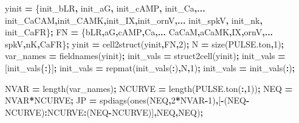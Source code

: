 \documentclass[
]{article}
\newenvironment{Shaded}{\begin{snugshade}}{\end{snugshade}}
\newcommand{\FloatTok}[1]{\textcolor[rgb]{0.00,0.00,0.81}{#1}}
\newcommand{\FunctionTok}[1]{\textcolor[rgb]{0.00,0.00,0.00}{#1}}
\newcommand{\NormalTok}[1]{#1}
\newcommand{\OperatorTok}[1]{\textcolor[rgb]{0.81,0.36,0.00}{\textbf{#1}}}
\newcommand{\StringTok}[1]{\textcolor[rgb]{0.31,0.60,0.02}{#1}}
\begin{document}
\begin{Shaded}
\begin{Highlighting}[]
\NormalTok{yinit }\OperatorTok{=}\NormalTok{ \{init\_bLR}\OperatorTok{,}\NormalTok{ init\_aG}\OperatorTok{,}\NormalTok{ init\_cAMP}\OperatorTok{,}\NormalTok{ init\_Ca}\OperatorTok{,...}
\NormalTok{        init\_CaCAM}\OperatorTok{,}\NormalTok{init\_CAMK}\OperatorTok{,}\NormalTok{init\_IX}\OperatorTok{,}\NormalTok{init\_ornV}\OperatorTok{,...}
\NormalTok{        init\_spkV}\OperatorTok{,}\NormalTok{ init\_nk}\OperatorTok{,}\NormalTok{ init\_CaFR\}}\OperatorTok{;}
\NormalTok{FN }\OperatorTok{=}\NormalTok{ \{}\StringTok{\textquotesingle{}bLR\textquotesingle{}}\OperatorTok{,}\StringTok{\textquotesingle{}aG\textquotesingle{}}\OperatorTok{,}\StringTok{\textquotesingle{}cAMP\textquotesingle{}}\OperatorTok{,}\StringTok{\textquotesingle{}Ca\textquotesingle{}}\OperatorTok{,...}
    \StringTok{\textquotesingle{}CaCaM\textquotesingle{}}\OperatorTok{,}\StringTok{\textquotesingle{}aCaMK\textquotesingle{}}\OperatorTok{,}\StringTok{\textquotesingle{}IX\textquotesingle{}}\OperatorTok{,}\StringTok{\textquotesingle{}ornV\textquotesingle{}}\OperatorTok{,...}
    \StringTok{\textquotesingle{}spkV\textquotesingle{}}\OperatorTok{,}\StringTok{\textquotesingle{}nK\textquotesingle{}}\OperatorTok{,}\StringTok{\textquotesingle{}CaFR\textquotesingle{}}\NormalTok{\}}\OperatorTok{;}
\NormalTok{yinit }\OperatorTok{=} \FunctionTok{cell2struct}\NormalTok{(yinit}\OperatorTok{,}\NormalTok{FN}\OperatorTok{,}\FloatTok{2}\NormalTok{)}\OperatorTok{;}
\NormalTok{N }\OperatorTok{=} \FunctionTok{size}\NormalTok{(PULSE.ton}\OperatorTok{,}\FloatTok{1}\NormalTok{)}\OperatorTok{;}
\NormalTok{var\_names }\OperatorTok{=} \FunctionTok{fieldnames}\NormalTok{(yinit)}\OperatorTok{;}
\NormalTok{init\_vals }\OperatorTok{=} \FunctionTok{struct2cell}\NormalTok{(yinit)}\OperatorTok{;}
\NormalTok{init\_vals }\OperatorTok{=}\NormalTok{ [init\_vals\{}\OperatorTok{:}\NormalTok{\}]}\OperatorTok{;}
\NormalTok{init\_vals }\OperatorTok{=} \FunctionTok{repmat}\NormalTok{(init\_vals(}\OperatorTok{:}\NormalTok{)}\OperatorTok{\textquotesingle{},}\NormalTok{N}\OperatorTok{,}\FloatTok{1}\NormalTok{)}\OperatorTok{;}
\NormalTok{init\_vals }\OperatorTok{=}\NormalTok{ init\_vals(}\OperatorTok{:}\NormalTok{)}\OperatorTok{\textquotesingle{};}      

\NormalTok{NVAR }\OperatorTok{=} \FunctionTok{length}\NormalTok{(var\_names)}\OperatorTok{;}
\NormalTok{NCURVE }\OperatorTok{=} \FunctionTok{length}\NormalTok{(PULSE.ton(}\OperatorTok{:,}\FloatTok{1}\NormalTok{))}\OperatorTok{;}
\NormalTok{NEQ }\OperatorTok{=}\NormalTok{ NVAR}\OperatorTok{*}\NormalTok{NCURVE}\OperatorTok{;}
\NormalTok{JP }\OperatorTok{=} \FunctionTok{spdiags}\NormalTok{(}\FunctionTok{ones}\NormalTok{(NEQ}\OperatorTok{,}\FloatTok{2}\OperatorTok{*}\NormalTok{NVAR}\OperatorTok{{-}}\FloatTok{1}\NormalTok{)}\OperatorTok{,}\NormalTok{[}\OperatorTok{{-}}\NormalTok{(NEQ}\OperatorTok{{-}}\NormalTok{NCURVE)}\OperatorTok{:}\NormalTok{NCURVE}\OperatorTok{:}\NormalTok{(NEQ}\OperatorTok{{-}}\NormalTok{NCURVE)]}\OperatorTok{,}\NormalTok{NEQ}\OperatorTok{,}\NormalTok{NEQ)}\OperatorTok{;}


\end{Highlighting}
\end{Shaded}
\end{document}
